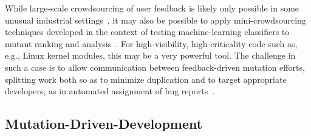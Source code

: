 While large-scale crowdsourcing of user feedback is likely only
possible in some unusual industrial
settings~\cite{MutGoogle,ivankovic2018industrial}, it may also be
possible to apply mini-crowdsourcing techniques developed in the
context of testing machine-learning classifiers to mutant ranking and
analysis~\cite{Minicrowd}.  For high-visibility, high-criticality code
such as, e.g., Linux kernel modules, this may be a very powerful
tool.  The challenge in such a case is to allow communication between
feedback-driven mutation efforts, splitting work both so as to
minimize duplication and to target appropriate developers, as in automated assignment of
bug reports~\cite{bhattacharya2012automated,jonsson2016automated}.


\subsection{Mutation-Driven-Development}

